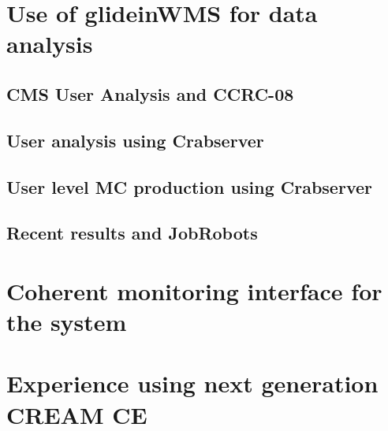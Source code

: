 \documentclass[a4paper]{jpconf}
\begin{document}
\section{Use of glideinWMS for data analysis}



\subsection{CMS User Analysis and CCRC-08}



\subsection{User analysis using Crabserver}



\subsection{User level MC production using Crabserver}



\subsection{Recent results and JobRobots}



\section{Coherent monitoring interface for the system}



\section{Experience using next generation CREAM CE}
\end{document}
